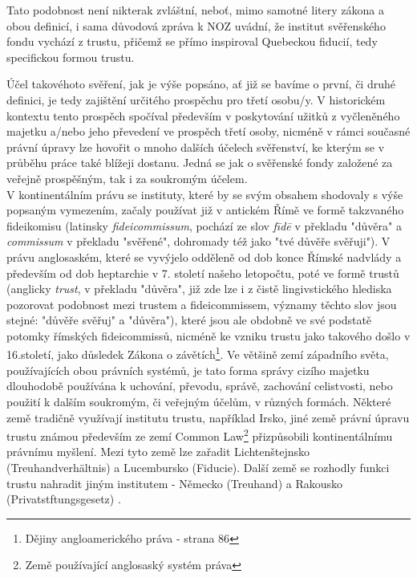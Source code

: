 \documentclass{article}
\begin{document}
Tato podobnost není nikterak zvláštní, neboť, mimo samotné litery zákona a obou definicí, i sama důvodová zpráva k NOZ uvádní, že institut svěřenského fondu vychází z trustu, přičemž se přímo inspiroval Quebeckou fiducií, tedy specifickou formou trustu.


Účel takovéhoto svěření, jak je výše popsáno, ať již se bavíme o první, či druhé definici, je tedy zajištění určitého prospěchu pro třetí osobu/y. V historickém kontextu tento prospěch spočíval především v poskytování užitků z vyčleněného majetku a/nebo jeho převedení ve prospěch třetí osoby, nicméně v rámci současné právní úpravy lze hovořit o mnoho dalších účelech svěřenství, ke kterým se v průběhu práce také blížeji dostanu. Jedná se jak o svěřenské fondy založené za veřejně prospěšným, tak i za soukromým účelem.\\

\indent V kontinentálním právu se instituty, které by se svým obsahem shodovaly s výše popsaným vymezením, začaly používat již v antickém Římě ve formě takzvaného fideikomisu (latinsky \textit{fideicommissum}, pochází ze slov \textit{fīdē} v překladu "důvěra" a \textit{commissum} v překladu "svěřené", dohromady též jako "tvé důvěře svěřuji"). V právu anglosaském, které se vyvýjelo odděleně od dob konce Římské nadvlády a především od dob heptarchie v 7. století našeho letopočtu, poté ve formě trustů (anglicky \textit{trust}, v překladu "důvěra", již zde lze i z čistě lingivstického hlediska pozorovat podobnost mezi trustem a fideicommissem, významy těchto slov jsou stejné: "důvěře svěřuj" a "důvěra"), které jsou ale obdobně ve své podstatě potomky římských fideicommissů, nicméně ke vzniku trustu jako takového došlo v 16.století, jako důsledek Zákona o závětích\footnote{Dějiny angloamerického práva - strana 86}. Ve většině zemí západního světa, používajících obou právních sys\-témů, je tato forma správy cizího majetku dlouhodobě používána k uchování, převodu, správě, zachování celistvosti, nebo použití k dalším soukromým, či veřejným účelům, v různých formách. Některé země tradičně využívají institutu trustu, například Irsko, jiné země právní úpravu trustu známou především ze zemí Common Law\footnote{Země používající anglosaský systém práva} přizpůsobili kontinentálnímu právnímu myšlení. Mezi tyto země lze zařadit Lichtenštejnsko (Treuhandverhältnis) a Lucembursko (Fiducie). Další země se rozhodly funkci trustu nahradit jiným institutem - Německo (Treuhand) a Rakousko (Privatstftungsgesetz) . \\
\end{document}
